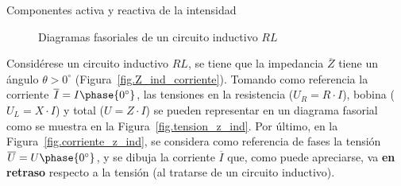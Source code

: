 \documentclass[11pt]{book} %
\makeatletter
\numberwithin{dummy}{section}
\theoremstyle{ocrenumbox}
\theoremstyle{blacknumex}
\theoremstyle{blacknumbox}
\theoremstyle{ocrenum}
\renewcommand{\section}{\@startsection{section}{1}{\z@}
{-4ex \@plus -1ex \@minus -.4ex}
{1ex \@plus.2ex }
{\normalfont\large\sffamily\bfseries}}
\newlength\esp
\makeatother
\begin{document}
	\section{Componentes activa y reactiva de la intensidad}
	\begin{figure}[htbp]
		\centering
		\hfill
		\hfill
		\hfil
		\caption{Diagramas fasoriales de un circuito inductivo $RL$}
		\label{fig.fasores_inductivo_corrientes}
	\end{figure}
	Considérese un circuito inductivo $RL$, se tiene que la impedancia $\overline{Z}$ tiene un ángulo $\theta>0^\circ$ (Figura~\ref{fig.Z_ind_corriente}). Tomando como referencia la corriente $\overline{I}=I\phase{0^\circ}$, las tensiones en la resistencia ($U_R=R\cdot I$), bobina ($U_L=X\cdot I$) y total ($U=Z\cdot I$) se pueden representar en un diagrama fasorial como se muestra en la Figura~\ref{fig.tension_z_ind}. Por último, en la Figura~\ref{fig.corriente_z_ind}, se considera como referencia de fases la tensión $\overline{U}=U\phase{0^\circ}$, y se dibuja la corriente $\overline{I}$ que, como puede apreciarse, va \textbf{en retraso} respecto a la tensión (al tratarse de un circuito inductivo). 
	
\end{document}
